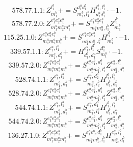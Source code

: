 \documentclass[letterpaper,10pt,fleqn,leqno,onecolumn]{article}
\begin{document}
\begin{equation} \;\;\;\;\;\;  578.77.1.1: Z^{l_{1}^{b}}_{m_{1}^{b}}+=S^{d_{1}^{a}d_{1}^{b}}_{m_{1}^{b},l_{1}^{a}}H^{l_{1}^{b},l_{1}^{a}}_{d_{1}^{a}d_{1}^{b}}\cdot -1. \end{equation}
\begin{equation} \;\;\;\;\;\;  578.77.2.0: Z^{e_{1}^{a}e_{2}^{a}e_{1}^{b}}_{m_{1}^{a}m_{2}^{a}m_{1}^{b}}+=S^{e_{1}^{a}e_{2}^{a}e_{1}^{b}}_{m_{1}^{a}m_{2}^{a},l_{1}^{b}}Z^{l_{1}^{b}}_{m_{1}^{b}} \end{equation}
\begin{equation} \;\;\;\;\;\;  115.25.1.0: Z^{e_{1}^{a}e_{2}^{a}e_{1}^{b}}_{m_{1}^{a}m_{2}^{a}m_{1}^{b}}+=S^{e_{1}^{a}e_{2}^{a}e_{1}^{b}}_{m_{1}^{a}m_{2}^{a},l_{1}^{b}}H^{l_{1}^{b}}_{m_{1}^{b}}\cdot -1. \end{equation}
\begin{equation} \;\;\;\;\;\;  339.57.1.1: Z^{e_{1}^{a},l_{1}^{b}}_{m_{1}^{a},d_{1}^{b}}+=H^{e_{1}^{a},l_{1}^{b}}_{d_{1}^{b},d_{1}^{a}}S^{d_{1}^{a}}_{m_{1}^{a}}\cdot -1. \end{equation}
\begin{equation} \;\;\;\;\;\;  339.57.2.0: Z^{e_{1}^{a}e_{2}^{a}e_{1}^{b}}_{m_{1}^{a}m_{2}^{a}m_{1}^{b}}+=S^{e_{1}^{a}e_{1}^{b},d_{1}^{b}}_{m_{1}^{a}m_{1}^{b},l_{1}^{b}}Z^{e_{2}^{a},l_{1}^{b}}_{m_{2}^{a},d_{1}^{b}} \end{equation}
\begin{equation} \;\;\;\;\;\;  528.74.1.1: Z^{e_{1}^{a},l_{1}^{b}}_{m_{1}^{a},d_{1}^{b}}+=S^{e_{1}^{a},d_{2}^{b}}_{m_{1}^{a},l_{2}^{b}}H^{l_{1}^{b},l_{2}^{b}}_{d_{1}^{b},d_{2}^{b}} \end{equation}
\begin{equation} \;\;\;\;\;\;  528.74.2.0: Z^{e_{1}^{a}e_{2}^{a}e_{1}^{b}}_{m_{1}^{a}m_{2}^{a}m_{1}^{b}}+=S^{e_{1}^{a}e_{1}^{b},d_{1}^{b}}_{m_{1}^{a}m_{1}^{b},l_{1}^{b}}Z^{e_{2}^{a},l_{1}^{b}}_{m_{2}^{a},d_{1}^{b}} \end{equation}
\begin{equation} \;\;\;\;\;\;  544.74.1.1: Z^{e_{1}^{a},l_{1}^{b}}_{m_{1}^{a},d_{1}^{b}}+=S^{e_{1}^{a},d_{1}^{a}}_{m_{1}^{a},l_{1}^{a}}H^{l_{1}^{b},l_{1}^{a}}_{d_{1}^{b},d_{1}^{a}} \end{equation}
\begin{equation} \;\;\;\;\;\;  544.74.2.0: Z^{e_{1}^{a}e_{2}^{a}e_{1}^{b}}_{m_{1}^{a}m_{2}^{a}m_{1}^{b}}+=S^{e_{1}^{a}e_{1}^{b},d_{1}^{b}}_{m_{1}^{a}m_{1}^{b},l_{1}^{b}}Z^{e_{2}^{a},l_{1}^{b}}_{m_{2}^{a},d_{1}^{b}} \end{equation}
\begin{equation} \;\;\;\;\;\;  136.27.1.0: Z^{e_{1}^{a}e_{2}^{a}e_{1}^{b}}_{m_{1}^{a}m_{2}^{a}m_{1}^{b}}+=S^{e_{1}^{a}e_{1}^{b},d_{1}^{b}}_{m_{1}^{a}m_{1}^{b},l_{1}^{b}}H^{e_{2}^{a},l_{1}^{b}}_{m_{2}^{a},d_{1}^{b}} \end{equation}
\end{document}
